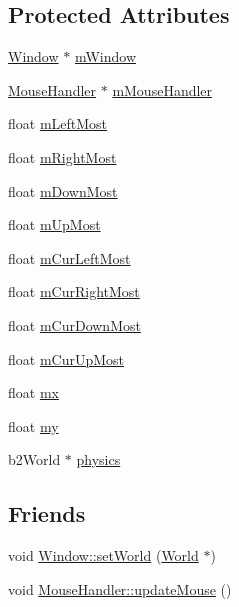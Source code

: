 \subsection*{Protected Attributes}
\begin{DoxyCompactItemize}
\item 
\hyperlink{classWindow}{Window} $\ast$ \hyperlink{classWorld_a9e60dc10845f02ed5866182140069be1}{m\+Window}
\item 
\hyperlink{classMouseHandler}{Mouse\+Handler} $\ast$ \hyperlink{classWorld_a9bab67b954d8de400ec06b07fa88c22b}{m\+Mouse\+Handler}
\item 
float \hyperlink{classWorld_aeecec3f91f92f263de2eadcb5a87fabd}{m\+Left\+Most}
\item 
float \hyperlink{classWorld_a2faeb13aa9c7217552654b2292e50f6a}{m\+Right\+Most}
\item 
float \hyperlink{classWorld_ab643703f63f5c3f8976d1a36b4ca9308}{m\+Down\+Most}
\item 
float \hyperlink{classWorld_a339db81bbb99ccf53f3cac5e9763d024}{m\+Up\+Most}
\item 
float \hyperlink{classWorld_ac0a6a277c98bb22fbb5fd8c8b30da604}{m\+Cur\+Left\+Most}
\item 
float \hyperlink{classWorld_aa4304f0ded86d76a21f4fdaaa56ad382}{m\+Cur\+Right\+Most}
\item 
float \hyperlink{classWorld_a6c703fe8401bc1516dd6e8c474a8a74f}{m\+Cur\+Down\+Most}
\item 
float \hyperlink{classWorld_a657ccdad21b3984bf8c8837f500ac45e}{m\+Cur\+Up\+Most}
\item 
float \hyperlink{classWorld_a3a9816094376a49c55d2ba878ad33271}{mx}
\item 
float \hyperlink{classWorld_a3ef0e1ad2396eab18e18684f11d91529}{my}
\item 
b2\+World $\ast$ \hyperlink{classWorld_a99f3098ee94a83726a1ea67ea515417f}{physics}
\end{DoxyCompactItemize}
\subsection*{Friends}
\begin{DoxyCompactItemize}
\item 
void \hyperlink{classWorld_a114ccd993c0013f7d74f046d597bdf35}{Window\+::set\+World} (\hyperlink{classWorld}{World} $\ast$)
\item 
void \hyperlink{classWorld_a881adea56e40e4fed79d7c7b68f41a91}{Mouse\+Handler\+::update\+Mouse} ()
\end{DoxyCompactItemize}


